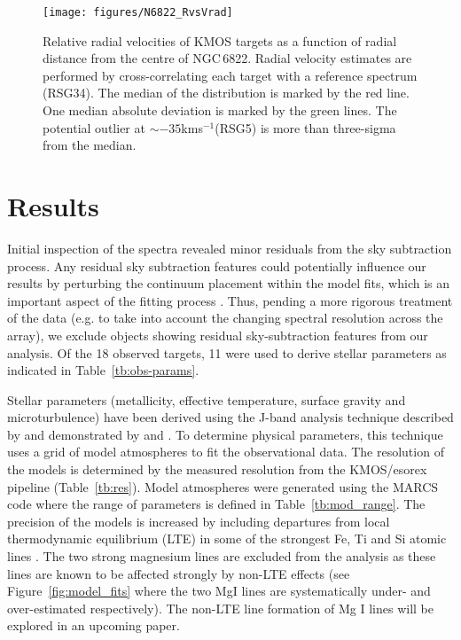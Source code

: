 \documentclass[iop]{emulateapj}
\begin{document}

\begin{figure}
 \texttt{[image: figures/N6822\_RvsVrad]}
 \caption{
 Relative radial velocities of KMOS targets as a function of radial distance from the centre of NGC\,6822.
 Radial velocity estimates are performed by cross-correlating each target with a reference spectrum (RSG34).
 The median of the distribution is marked by the red line.
 One median absolute deviation is marked by the green lines.
 The potential outlier at $\sim-35$kms$^{-1}$(RSG5) is more than three-sigma from the median.
 }
 \label{fig:Vrad}
\end{figure}


\section{Results} %
\label{sec:results}
Initial inspection of the spectra revealed minor residuals from the sky subtraction process.
Any residual sky subtraction features could potentially influence our results by perturbing the continuum placement within the model fits, which is an important aspect of the fitting process
\citep[see][for more discussion]{Davies14,2014ApJ...788...58G}.
Thus, pending a more rigorous treatment of the data
(e.g. to take into account the changing spectral resolution across the array),
we exclude objects showing residual sky-subtraction features from our analysis.
Of the 18 observed targets, 11 were used to derive stellar parameters
as indicated in Table~\ref{tb:obs-params}.

Stellar parameters
(metallicity, effective temperature, surface gravity and microturbulence)
have been derived using the J-band analysis technique described by
\cite{Davies10} and demonstrated by
\cite{Davies14} and
\cite{2014ApJ...788...58G}.
To determine physical parameters, this technique uses a grid of model atmospheres to fit the observational data.
The resolution of the models is determined by the measured resolution from the KMOS/esorex pipeline (Table~\ref{tb:res}).
Model atmospheres were generated using the MARCS code
\citep{Gustafsson08} where the range of parameters is defined in
Table~\ref{tb:mod_range}.
The precision of the models is increased by including departures from local thermodynamic equilibrium (LTE) in some of the strongest Fe, Ti and Si atomic lines
\citep{2012ApJ...751..156B,2013ApJ...764..115B}.
The two strong magnesium lines are excluded from the analysis as these lines are known to be affected strongly by non-LTE effects
(see Figure~\ref{fig:model_fits} where the two MgI lines are systematically under- and over-estimated respectively).
The non-LTE line formation of Mg I lines will be explored in an upcoming paper.
\end{document}
